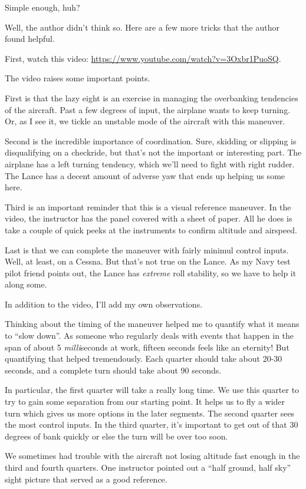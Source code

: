 Simple enough, huh?

Well, the author didn't think so. Here are a few more tricks that the author found helpful.

First, watch this video: \url{https://www.youtube.com/watch?v=3Oxbr1PuoSQ}.

The video raises some important points.

First is that the lazy eight is an exercise in managing the overbanking tendencies of the aircraft. Past a few degrees of input, the airplane wants to keep turning. Or, as I see it, we tickle an unstable mode of the aircraft with this maneuver.

Second is the incredible importance of coordination. Sure, skidding or slipping is disqualifying on a checkride, but that's not the important or interesting part. The airplane has a left turning tendency, which we'll need to fight with right rudder. The Lance has a decent amount of adverse yaw that ends up helping us some here.

Third is an important reminder that this is a visual reference maneuver. In the video, the instructor has the panel covered with a sheet of paper. All he does is take a couple of quick peeks at the instruments to confirm altitude and airspeed.

Last is that we can complete the maneuver with fairly minimul control inputs. Well, at least, on a Cessna. But that's not true on the Lance. As my Navy test pilot friend points out, the Lance has \emph{extreme} roll stability, so we have to help it along some.

In addition to the video, I'll add my own observations.

Thinking about the timing of the maneuver helped me to quantify what it means to ``slow down''. As someone who regularly deals with events that happen in the span of about 5 \emph{milli}seconds at work, fifteen seconds feels like an eternity! But quantifying that helped tremendously. Each quarter should take about 20-30 seconds, and a complete turn should take about 90 seconds.

In particular, the first quarter will take a really long time. We use this quarter to try to gain some separation from our starting point. It helps us to fly a wider turn which gives us more options in the later segments. The second quarter sees the most control inputs. In the third quarter, it's important to get out of that 30 degrees of bank quickly or else the turn will be over too soon.

We sometimes had trouble with the aircraft not losing altitude fast enough in the third and fourth quarters. One instructor pointed out a ``half ground, half sky'' sight picture that served as a good reference.

